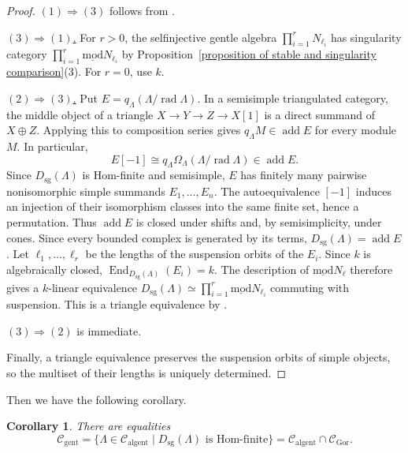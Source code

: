 \documentclass[11pt]{article}
\newcommand{\rad}{\operatorname{rad}}
\newcommand{\End}{\operatorname{End}}
\newcommand{\add}{\operatorname{add}}
\newcommand{\smod}{\operatorname{\underline{mod}}}
\providecommand{\varLambda}{\Lambda}
\newtheorem{corollary}[theorem]{Corollary}
\theoremstyle{definition}
\begin{document}
		\begin{proof}
			\underline{$(1)\Rightarrow(3)$} follows from \cite[Theorem~2.5 and Remark~2.6]{Kal15}.

			\underline{$(3)\Rightarrow(1)$.}
			For $r>0$, the selfinjective gentle algebra $\prod_{i=1}^r N_{\ell_i}$ has singularity category $\prod_{i=1}^r\smod N_{\ell_i}$ by Proposition~\ref{proposition of stable and singularity comparison}(3). For $r=0$, use $k$.

			\underline{$(2)\Rightarrow(3)$.}
			Put $E=q_{\varLambda}(\varLambda/\rad\varLambda)$. In a semisimple triangulated category, the middle object of a triangle $X\to Y\to Z\to X[1]$ is a direct summand of $X\oplus Z$. Applying this to composition series gives $q_{\varLambda}M\in\add E$ for every module $M$. In particular,
			\[
				E[-1]\cong
				q_{\varLambda}\Omega_{\varLambda}(\varLambda/\rad\varLambda)
				\in\add E.
			\]
			Since $D_{\mathrm{sg}}(\varLambda)$ is Hom-finite and semisimple, $E$ has finitely
			many pairwise nonisomorphic simple summands $E_1,\ldots,E_n$. The autoequivalence $[-1]$ induces an injection of their isomorphism classes into the same finite set, hence a permutation. Thus $\add E$ is closed under shifts and, by semisimplicity,
			under cones. Since every bounded complex is generated by its terms, $D_{\mathrm{sg}}(\varLambda)=\add E$. Let $\ell_1,\ldots,\ell_r$ be the lengths of the suspension
			orbits of the $E_i$. Since $k$ is algebraically closed, $\End_{D_{\mathrm{sg}}(\varLambda)}(E_i)=k$. The description of $\smod N_\ell$ therefore gives a
			$k$-linear equivalence $D_{\mathrm{sg}}(\varLambda)\simeq\prod_{i=1}^r\smod N_{\ell_i}$ commuting with suspension. This is a triangle equivalence by \cite[Lemma~3.4]{Che11}.

			\underline{$(3)\Rightarrow(2)$} is immediate.

			Finally, a triangle equivalence preserves the suspension orbits of simple objects, so the multiset of their lengths is uniquely determined.
		\end{proof}

		Then we have the following corollary.

		\begin{corollary}\label{corollary of gentle almost gentle singularity classes}
			There are equalities
			\[
				\mathcal C_{\mathrm{gent}}
				=\{\varLambda\in\mathcal C_{\mathrm{algent}}\mid D_{\mathrm{sg}}(\varLambda)\text{ is Hom-finite}\}
				=\mathcal C_{\mathrm{algent}}\cap\mathcal C_{\mathrm{Gor}}.
			\]
		\end{corollary}
\end{document}
